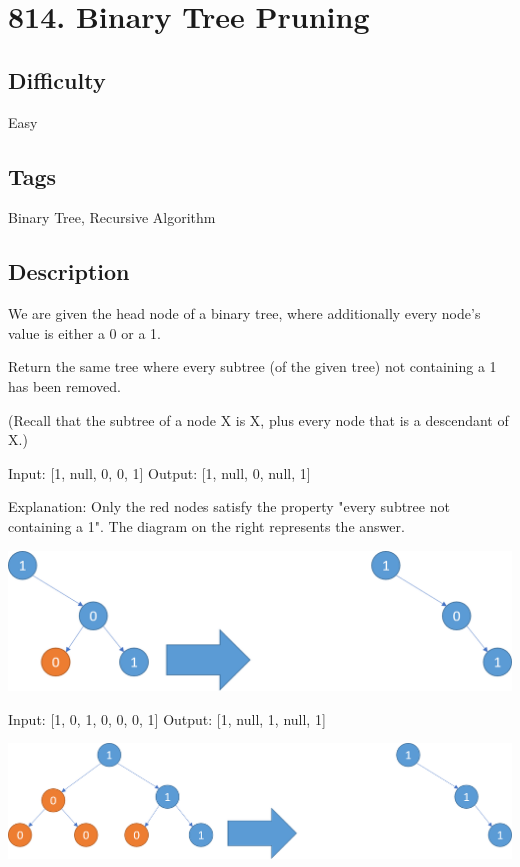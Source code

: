 \tocless\section{814. Binary Tree Pruning}
\label{algo:814}

\subsection*{Difficulty}
Easy

\subsection*{Tags}
Binary Tree, Recursive Algorithm

\subsection*{Description}
We are given the head node  of a binary tree, where additionally every node's value is either a 0 or a 1.

Return the same tree where every subtree (of the given tree) not containing a 1 has been removed.

(Recall that the subtree of a node X is X, plus every node that is a descendant of X.)
\begin{example}
\begin{multilinecode}
Input: [1, null, 0, 0, 1]
Output: [1, null, 0, null, 1]

Explanation:
Only the red nodes satisfy the property "every subtree not containing a 1".
The diagram on the right represents the answer.
\end{multilinecode}
\includegraphics*[width=14cm]{figs/algo_814_1}
\end{example}

\begin{example}
\begin{multilinecode}
Input: [1, 0, 1, 0, 0, 0, 1]
Output: [1, null, 1, null, 1]
\end{multilinecode}
\includegraphics*[width=14cm]{figs/algo_814_2}
\end{example}


